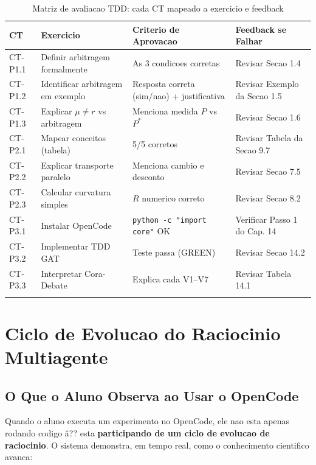 \begin{center}
\begin{longtable}{p{}p{}p{}p{}}
\toprule
\textbf{CT} & \textbf{Exercicio} & \textbf{Criterio de Aprovacao} & \textbf{Feedback se Falhar} \\
\midrule
CT-P1.1 & Definir arbitragem formalmente & As 3 condicoes corretas & Revisar Secao 1.4 \\
CT-P1.2 & Identificar arbitragem em exemplo & Resposta correta (sim/nao) + justificativa & Revisar Exemplo da Secao 1.5 \\
CT-P1.3 & Explicar $\mu \neq r$ vs arbitragem & Menciona medida $P$ vs $P^*$ & Revisar Secao 1.6 \\
CT-P2.1 & Mapear conceitos (tabela) & 5/5 corretos & Revisar Tabela da Secao 9.7 \\
CT-P2.2 & Explicar transporte paralelo & Menciona cambio e desconto & Revisar Secao 7.5 \\
CT-P2.3 & Calcular curvatura simples & $R$ numerico correto & Revisar Secao 8.2 \\
CT-P3.1 & Instalar OpenCode & \texttt{python -c "import core"} OK & Verificar Passo 1 do Cap. 14 \\
CT-P3.2 & Implementar TDD GAT & Teste passa (GREEN) & Revisar Secao 14.2 \\
CT-P3.3 & Interpretar Cora-Debate & Explica cada V1--V7 & Revisar Tabela 14.1 \\
\bottomrule
\caption{Matriz de avaliacao TDD: cada CT mapeado a exercicio e feedback}
\label{tab:tdd_ped}
\end{longtable}
\end{center}

\section{Ciclo de Evolucao do Raciocinio Multiagente}

\subsection{O Que o Aluno Observa ao Usar o OpenCode}

Quando o aluno executa um experimento no OpenCode, ele nao esta apenas
rodando codigo \^a?? esta \textbf{participando de um ciclo de evolucao de
raciocinio}. O sistema demonstra, em tempo real, como o conhecimento
cientifico avanca:

